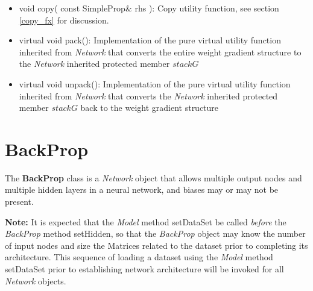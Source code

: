 \documentclass{report}
\begin{document}
\begin{itemize}
\begin{itemize}
\item void copy( const SimpleProp\& rhs ): Copy utility function, see
      section \ref{copy_fx} for discussion.
\item virtual void pack(): Implementation of the pure virtual utility
      function inherited from {\em Network} that converts the entire
      weight gradient structure to the {\em Network} inherited
      protected member $stackG$
\item virtual void unpack(): Implementation of the pure virtual
      utility function inherited from {\em Network} that converts the
      {\em Network} inherited protected member $stackG$ back to the
      weight gradient structure
\end{itemize}

\end{itemize}

\section{BackProp}

The {\bf BackProp} class is a {\em Network} object that allows
multiple output nodes and multiple hidden layers in a neural network,
and biases may or may not be present.

{\bf Note:} It is expected that the {\em Model} method setDataSet be
called {\em before} the {\em BackProp} method setHidden, so that the
{\em BackProp} object may know the number of input nodes and size the
Matrices related to the dataset prior to completing its architecture.
This sequence of loading a dataset using the {\em Model} method
setDataSet prior to establishing network architecture will be invoked
for all {\em Network} objects.
\end{document}
